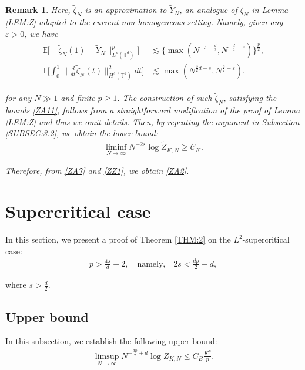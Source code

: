 \documentclass[letterpaper, 11pt,  reqno]{amsart}
\newtheorem{remark}[theorem]{Remark}
\newcommand{\noi}{\noindent}
\newcommand{\eps}{\varepsilon}
\newcommand{\wt}{\widetilde}
\numberwithin{equation}{section}
\numberwithin{theorem}{section}
\newcommand{\ze}{\zeta}
\newcommand{\CC}{\mathcal{C}}
\begin{document}
\begin{remark}
\noi
Here, $\wt \ze_N$ is an approximation to $\wt Y_N$, 
an analogue of $\ze_N$
in 
 Lemma \ref{LEM:Z}
adapted to the current non-homogeneous setting.
Namely, 
 given any $\eps > 0$, 
 we have 
\begin{align}
\begin{split}
 \mathbb{E} \Big[\|\wt \ze_N (1) - \wt Y_N \|^p_{L^p (\mathbb{T}^d)}\Big] 
 & \lesssim 
\big\{\max
(N^{- s + \frac{d}{2}}, N^{- \frac{d}{2} +\eps})\big\}^{\frac{p}{2}}, \\
 \mathbb{E} \bigg[ \int_0^1 \Big\|  \frac{d}{dt} \wt \ze_N (t) \Big\|_{H^s (\mathbb{T}^d)}^2 dt \bigg] 
& \lesssim \max
(N^{\frac{3 }{2}d - s}, N^{\frac{d}{2} +\eps }).
\end{split}
\label{ZA11}
\end{align}


\noi
for any $N \gg 1$ and  finite $ p \geq 1$.
The construction of such $\wt \ze_N$, satisfying 
the bounds  \eqref{ZA11}, follows from a straightforward
modification of the proof of Lemma \ref{LEM:Z}
and thus we omit details.
Then, 
 by repeating the argument in Subsection \ref{SUBSEC:3.2}, 
 we 
 obtain the lower bound:
\begin{align}
\liminf_{N\to \infty}N^{-2s} \log \wt Z_{K, N}\ge \CC_K.
\label{ZZ1}
\end{align}


Therefore,
 from \eqref{ZA7} and \eqref{ZZ1}, 
 we obtain \eqref{ZA2}.



\end{remark}















\section{Supercritical case}\label{SEC:4}


In this section, we present a proof of Theorem \ref{THM:2}
on the $L^2$-supercritical case:
\begin{align}
 p>\frac{4s}{d}+2, \quad \text{namely,}
 \quad 2s < \frac {dp}2 - d, 
 \label{sp1}
\end{align}

\noi
where $s > \frac d2$.


\subsection{Upper bound}
In this subsection, we  establish the following upper bound:
\begin{align}
\limsup_{N \to \infty}
N^{-\frac{dp}{2}+d}\log Z_{K, N}\le C_B \frac{K^{p}}{p}.
\label{sp0a}
\end{align}
\end{document}
